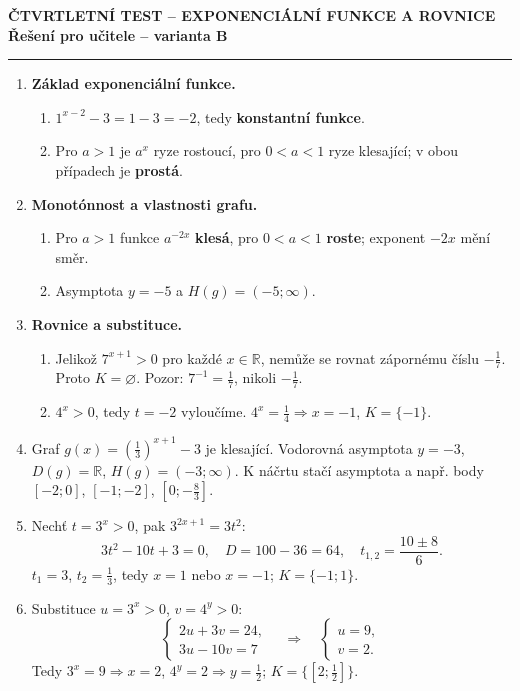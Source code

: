\documentclass[a4paper,11pt]{article}
\newcommand{\Title}[1]{%
\begin{center}{\large\bfseries ČTVRTLETNÍ TEST -- EXPONENCIÁLNÍ FUNKCE A ROVNICE}\\[1mm]
{\bfseries Řešení pro učitele -- varianta #1}\end{center}\hrule\vspace{3mm}}
\begin{document}
\newpage
\Title{B}
\begin{enumerate}
\item \textbf{Základ exponenciální funkce.}
\begin{enumerate}[label=\alph*),leftmargin=6mm,itemsep=0.4mm,topsep=0.4mm]
\item $1^{x-2}-3=1-3=-2$, tedy \textbf{konstantní funkce}.
\item Pro $a>1$ je $a^x$ ryze rostoucí, pro $0<a<1$ ryze klesající; v obou případech je \textbf{prostá}.
\end{enumerate}
\item \textbf{Monotónnost a vlastnosti grafu.}
\begin{enumerate}[label=\alph*),leftmargin=6mm,itemsep=0.4mm,topsep=0.4mm]
\item Pro $a>1$ funkce $a^{-2x}$ \textbf{klesá}, pro $0<a<1$ \textbf{roste}; exponent $-2x$ mění směr.
\item Asymptota $\boxed{y=-5}$ a $\boxed{H(g)=(-5;\infty)}$.
\end{enumerate}
\item \textbf{Rovnice a substituce.}
\begin{enumerate}[label=\alph*),leftmargin=6mm,itemsep=0.4mm,topsep=0.4mm]
\item Jelikož $7^{x+1}>0$ pro každé $x\in\mathbb R$, nemůže se rovnat zápornému číslu $-\frac17$. Proto $\boxed{K=\varnothing}$. Pozor: $7^{-1}=\frac17$, nikoli $-\frac17$.
\item $4^x>0$, tedy $t=-2$ vyloučíme. $4^x=\frac14\Rightarrow x=-1$, $\boxed{K=\{-1\}}$.
\end{enumerate}

\item Graf $g(x)=\left(\frac13\right)^{x+1}-3$ je klesající. Vodorovná asymptota
$\boxed{y=-3}$, $\boxed{D(g)=\mathbb R}$, $\boxed{H(g)=(-3;\infty)}$.
K náčrtu stačí asymptota a např. body $[-2;0]$, $[-1;-2]$, $[0;-\frac83]$.
\item Nechť $t=3^x>0$, pak $3^{2x+1}=3t^2$:
\[3t^2-10t+3=0,\quad D=100-36=64,\quad t_{1,2}=\frac{10\pm8}{6}.\]
$t_1=3$, $t_2=\frac13$, tedy $x=1$ nebo $x=-1$;
$\boxed{K=\{-1;1\}}$.
\item Substituce $u=3^x>0$, $v=4^y>0$:
\[\begin{cases}2u+3v=24,\\3u-10v=7\end{cases}\quad\Longrightarrow\quad
\begin{cases}u=9,\\v=2.\end{cases}\]
Tedy $3^x=9\Rightarrow x=2$, $4^y=2\Rightarrow y=\frac12$;
$\boxed{K=\{[2;\frac12]\}}$.
\end{enumerate}
\end{document}
